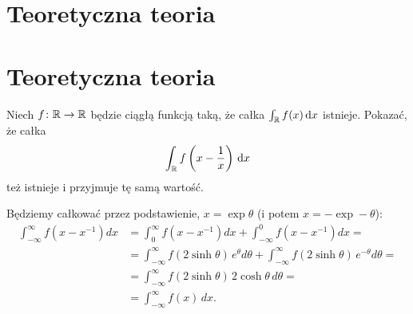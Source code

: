 %

\section{Teoretyczna teoria}
\section{Teoretyczna teoria} %

\begin{problem}
    \label{putnam_1968_b4}%
    Niech $f \colon {\mathbb R} \to {\mathbb R}$ będzie ciągłą funkcją taką, że całka $\int_{\mathbb R} f(x)\,\mathrm{d}x$ istnieje.
    Pokazać, że całka
    \begin{equation}
        \int_{\mathbb R} f\left(x - \frac 1 x\right)\,\mathrm{d}x
    \end{equation}
    też istnieje i przyjmuje tę samą wartość.
\end{problem}

\begin{solution} %
    Będziemy całkować przez podstawienie, $x = \exp \theta$ (i potem $x = - \exp -\theta$): %
    \begin{align} %
        \int_{-\infty}^{\infty}f\left(x-x^{-1}\right)dx&=\int_{0}^{\infty}f\left(x-x^{-1}\right)dx+\int_{-\infty}^{0}f\left(x-x^{-1}\right)dx=\\ %
        &=\int_{-\infty}^{\infty}f(2\sinh\theta)\,e^{\theta}d\theta+\int_{-\infty}^{\infty}f(2\sinh\theta)\,e^{-\theta}d\theta=\\ %
        &=\int_{-\infty}^{\infty}f(2\sinh\theta)\,2\cosh\theta\,d\theta=\\ %
        &=\int_{-\infty}^{\infty}f(x)\,dx. %
    \end{align} %
\end{solution} %

%
